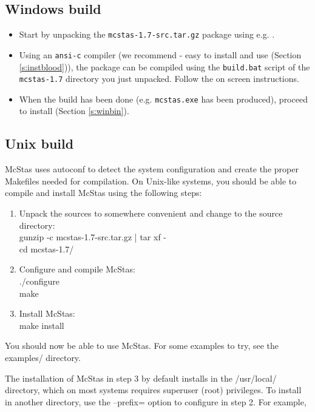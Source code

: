 \subsection{Windows build}
\begin{itemize}
\item{Start by unpacking the \texttt{mcstas-1.7-src.tar.gz} package using
e.g. .}
\item{Using an \texttt{ansi-c} compiler (we recommend
 - easy to install
and use (Section \ref{s:instblood})), the
 package can be
compiled using the \texttt{build.bat} script of the
\texttt{mcstas-1.7} directory you just unpacked. Follow the on screen
instructions.} 
\item{When the build has been done (e.g. \texttt{mcstas.exe}
has been produced), proceed to install (Section \ref{s:winbin}).}
\end{itemize}

\subsection{Unix build}
McStas uses autoconf to detect the system configuration and create the
proper Makefiles needed for compilation. On Unix-like systems, you
should be able to compile and install McStas using the following steps:
\begin{enumerate}
\item{Unpack the sources to somewhere convenient and change to the
    source directory:\\
  gunzip -c mcstas-1.7-src.tar.gz | tar xf -\\
  cd mcstas-1.7/}
\item{Configure and compile McStas:\\
  ./configure\\
  make}
\item{Install McStas:\\
  make install}
\end{enumerate}

\noindent You should now be able to use McStas. For some examples to try, see the
examples/ directory.

\noindent The installation of McStas in step 3 by default installs in the
/usr/local/ directory, which on most systems requires superuser (root)
privileges. To install in another directory, use the --prefix= option to
configure in step 2. For example,\\

